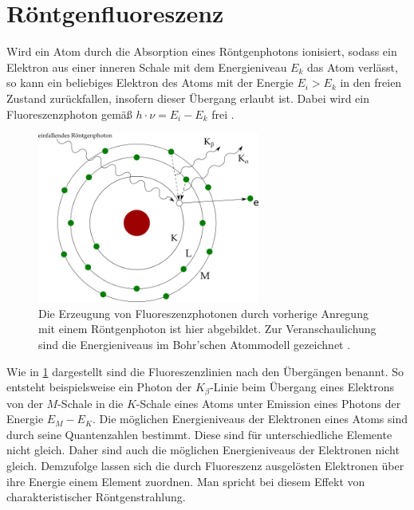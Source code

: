 \section{Röntgenfluoreszenz}
Wird ein Atom durch die Absorption eines Röntgenphotons ionisiert, sodass ein Elektron aus einer inneren Schale mit dem Energieniveau $E_k$ das Atom verlässt, so kann ein beliebiges Elektron des Atoms mit der Energie $E_i > E_k$ in den freien Zustand zurückfallen, insofern dieser Übergang erlaubt ist. Dabei wird ein Fluoreszenzphoton gemäß $h \cdot \nu = E_i - E_k$ frei \cite[S.~261]{dem3}.

\begin{figure}[H] 
  \centering
     \includegraphics[width=0.65\textwidth]{illustrations/fluorescence.png}
  \caption[Skizze Fluoreszenz]{Die Erzeugung von Fluoreszenzphotonen durch vorherige Anregung mit einem Röntgenphoton ist hier abgebildet. Zur Veranschaulichung sind die Energieniveaus im Bohr'schen Atommodell gezeichnet \cite[S.~25, bearbeitet]{hanna}.}
  \label{fig:fluoreszenz}
\end{figure}

\noindent Wie in \cref{fig:fluoreszenz} dargestellt sind die Fluoreszenzlinien nach den Übergängen benannt. So entsteht beispielsweise ein Photon der $K_{\beta}$-Linie beim Übergang eines Elektrons von der $M$-Schale in die $K$-Schale eines Atoms unter Emission eines Photons der Energie $E_M - E_K$. Die möglichen Energieniveaus der Elektronen eines Atoms sind durch seine Quantenzahlen bestimmt. Diese sind für unterschiedliche Elemente nicht gleich. Daher sind auch die möglichen Energieniveaus der Elektronen nicht gleich. Demzufolge lassen sich die durch Fluoreszenz ausgelösten Elektronen über ihre Energie einem Element zuordnen. Man spricht bei diesem Effekt von charakteristischer Röntgenstrahlung.
